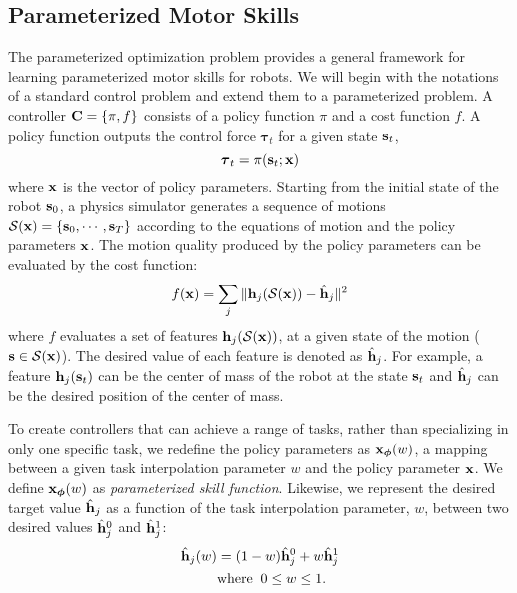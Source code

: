\subsection{Parameterized Motor Skills}
\label{sec:optskills_param_motor_prob}
The parameterized optimization problem provides a general framework
for learning parameterized motor skills for robots. We will begin with the notations
of a standard control problem and extend them to a parameterized
problem. A controller $\mathbf{C}=\{\pi, f\}$ consists
of a policy function $\pi$ and a cost function $f$. A policy function
outputs the control force $\boldsymbol{\tau}_t$ for a given state $\mathbf{s}_t$,
\begin{equation}
\boldsymbol{\tau}_t = \pi(\mathbf{s}_t; \mathbf{x})
\end{equation}
where $\mathbf{x}$ is the vector of policy parameters. Starting from the
initial state of the robot $\mathbf{s}_0$, a physics simulator generates a
sequence of motions $\mathcal{S}(\mathbf{x}) = \{\mathbf{s}_0, \cdots,
\mathbf{s}_{T}\}$ according to the equations of motion and the policy parameters $\mathbf{x}$. The
motion quality produced by the policy parameters can be
evaluated by the cost function:
\begin{equation}
  \begin{aligned}
    f(\mathbf{x}) 
    = \sum_j \| \mathbf{h}_j(\mathcal{S}(\mathbf{x})) - \hat{\mathbf{h}}_j \|^2
    \label{eq:optskills_costfunc}
  \end{aligned}
\end{equation} 
where $f$ evaluates a set of features
$\mathbf{h}_j(\mathcal{S}(\mathbf{x}))$, at a given
state of the motion ($\mathbf{s} \in \mathcal{S}(\mathbf{x})$). The desired
value of each feature is denoted as $\hat{\mathbf{h}}_j$.  For
example, a feature $\mathbf{h}_j(\mathbf{s}_t)$ can be the center
of mass of the robot at the state $\mathbf{s}_t$ and $\hat{\mathbf{h}}_j$ can
be the desired position of the center of mass.

To create controllers that can achieve a range of tasks, rather than
specializing in only one specific task, we redefine the policy
parameters as $\mathbf{x}_{\boldsymbol{\phi}}(w)$, a mapping between a
given task interpolation parameter $w$ and the policy parameter
$\mathbf{x}$. We define $\mathbf{x}_{\boldsymbol{\phi}}(w)$ as \emph{parameterized
  skill function}. Likewise, we represent the desired target value
$\hat{\mathbf{h}}_j$ as a function of the task interpolation parameter,
$w$, between two desired values $\hat{\mathbf{h}}_{j}^{0}$ and
$\hat{\mathbf{h}}_{j}^{1}$:
\begin{equation}
\begin{aligned}
\hat{\mathbf{h}}_j(w) &= (1-w)\hat{\mathbf{h}}_{j}^{0} + w \hat{\mathbf{h}}_{j}^{1}
\\
&\mathrm{where\;\;} 0 \leq w \leq 1.
\end{aligned}
\label{eq:optskills_paramtarget}
\end{equation}

